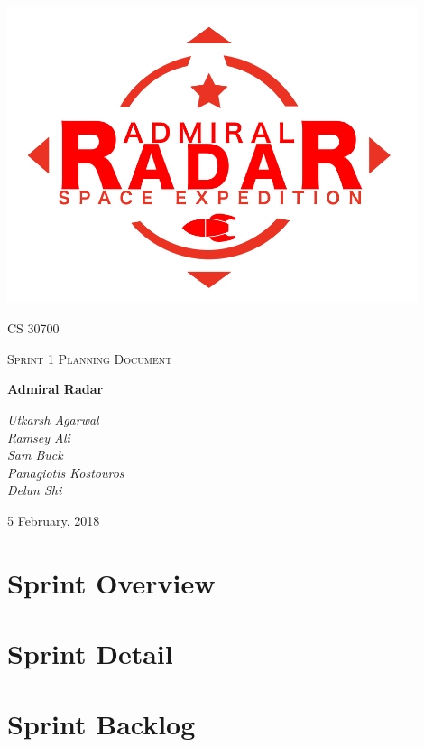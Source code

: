 \documentclass[12pt]{article}
\begin{document}
\begin{titlepage}
	\centering
	\includegraphics[width=0.9\textwidth]{logo}\par\vspace{1cm}
	{\scshape\LARGE CS 30700 \par}
	{\scshape\Large Sprint 1 Planning Document\par}
	\vspace{1.5cm}
	{\Huge\bfseries Admiral Radar\par}
	\vspace{1.5cm}
	{\large\itshape Utkarsh Agarwal\\ Ramsey Ali \\ Sam Buck \\ Panagiotis Kostouros \\ Delun Shi \par}

	\vfill
	{\large 5 February, 2018 \par}
\end{titlepage}

\section{Sprint Overview}


\section{Sprint Detail}


\section{Sprint Backlog}

\end{document}
